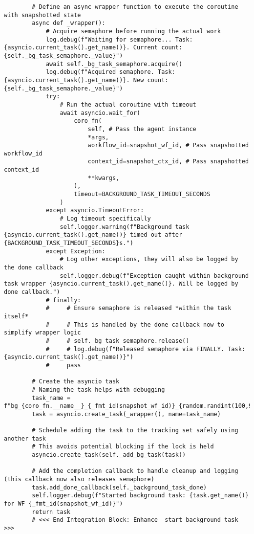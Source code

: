 \documentclass[12pt,a4paper]{article}
\begin{document}
\begin{pageablecode}
\begin{verbatim}
        # Define an async wrapper function to execute the coroutine with snapshotted state
        async def _wrapper():
            # Acquire semaphore before running the actual work
            log.debug(f"Waiting for semaphore... Task: {asyncio.current_task().get_name()}. Current count: {self._bg_task_semaphore._value}")
            await self._bg_task_semaphore.acquire()
            log.debug(f"Acquired semaphore. Task: {asyncio.current_task().get_name()}. New count: {self._bg_task_semaphore._value}")
            try:
                # Run the actual coroutine with timeout
                await asyncio.wait_for(
                    coro_fn(
                        self, # Pass the agent instance
                        *args,
                        workflow_id=snapshot_wf_id, # Pass snapshotted workflow_id
                        context_id=snapshot_ctx_id, # Pass snapshotted context_id
                        **kwargs,
                    ),
                    timeout=BACKGROUND_TASK_TIMEOUT_SECONDS
                )
            except asyncio.TimeoutError:
                # Log timeout specifically
                self.logger.warning(f"Background task {asyncio.current_task().get_name()} timed out after {BACKGROUND_TASK_TIMEOUT_SECONDS}s.")
            except Exception:
                # Log other exceptions, they will also be logged by the done callback
                self.logger.debug(f"Exception caught within background task wrapper {asyncio.current_task().get_name()}. Will be logged by done callback.")
            # finally:
            #     # Ensure semaphore is released *within the task itself*
            #     # This is handled by the done callback now to simplify wrapper logic
            #     # self._bg_task_semaphore.release()
            #     # log.debug(f"Released semaphore via FINALLY. Task: {asyncio.current_task().get_name()}")
            #     pass

        # Create the asyncio task
        # Naming the task helps with debugging
        task_name = f"bg_{coro_fn.__name__}_{_fmt_id(snapshot_wf_id)}_{random.randint(100,999)}"
        task = asyncio.create_task(_wrapper(), name=task_name)

        # Schedule adding the task to the tracking set safely using another task
        # This avoids potential blocking if the lock is held
        asyncio.create_task(self._add_bg_task(task))

        # Add the completion callback to handle cleanup and logging (this callback now also releases semaphore)
        task.add_done_callback(self._background_task_done)
        self.logger.debug(f"Started background task: {task.get_name()} for WF {_fmt_id(snapshot_wf_id)}")
        return task
        # <<< End Integration Block: Enhance _start_background_task >>>



\end{verbatim}
\end{pageablecode}
\end{document}
